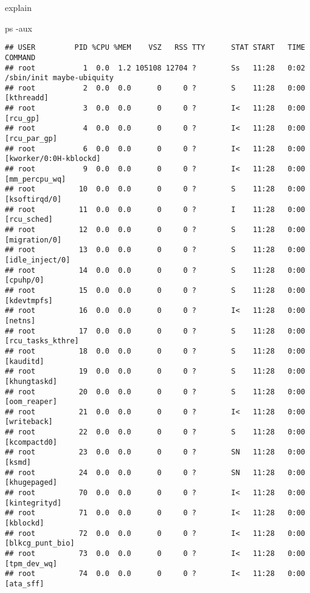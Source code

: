 \documentclass[]{article}
\newenvironment{Shaded}{}{}
\newcommand{\FunctionTok}[1]{\textcolor[rgb]{0.02,0.16,0.49}{#1}}
\newcommand{\NormalTok}[1]{#1}
\begin{document}
explain

\begin{Shaded}
\begin{Highlighting}[]
\FunctionTok{ps}\NormalTok{ -aux}
\end{Highlighting}
\end{Shaded}

\begin{verbatim}
## USER         PID %CPU %MEM    VSZ   RSS TTY      STAT START   TIME COMMAND
## root           1  0.0  1.2 105108 12704 ?        Ss   11:28   0:02 /sbin/init maybe-ubiquity
## root           2  0.0  0.0      0     0 ?        S    11:28   0:00 [kthreadd]
## root           3  0.0  0.0      0     0 ?        I<   11:28   0:00 [rcu_gp]
## root           4  0.0  0.0      0     0 ?        I<   11:28   0:00 [rcu_par_gp]
## root           6  0.0  0.0      0     0 ?        I<   11:28   0:00 [kworker/0:0H-kblockd]
## root           9  0.0  0.0      0     0 ?        I<   11:28   0:00 [mm_percpu_wq]
## root          10  0.0  0.0      0     0 ?        S    11:28   0:00 [ksoftirqd/0]
## root          11  0.0  0.0      0     0 ?        I    11:28   0:00 [rcu_sched]
## root          12  0.0  0.0      0     0 ?        S    11:28   0:00 [migration/0]
## root          13  0.0  0.0      0     0 ?        S    11:28   0:00 [idle_inject/0]
## root          14  0.0  0.0      0     0 ?        S    11:28   0:00 [cpuhp/0]
## root          15  0.0  0.0      0     0 ?        S    11:28   0:00 [kdevtmpfs]
## root          16  0.0  0.0      0     0 ?        I<   11:28   0:00 [netns]
## root          17  0.0  0.0      0     0 ?        S    11:28   0:00 [rcu_tasks_kthre]
## root          18  0.0  0.0      0     0 ?        S    11:28   0:00 [kauditd]
## root          19  0.0  0.0      0     0 ?        S    11:28   0:00 [khungtaskd]
## root          20  0.0  0.0      0     0 ?        S    11:28   0:00 [oom_reaper]
## root          21  0.0  0.0      0     0 ?        I<   11:28   0:00 [writeback]
## root          22  0.0  0.0      0     0 ?        S    11:28   0:00 [kcompactd0]
## root          23  0.0  0.0      0     0 ?        SN   11:28   0:00 [ksmd]
## root          24  0.0  0.0      0     0 ?        SN   11:28   0:00 [khugepaged]
## root          70  0.0  0.0      0     0 ?        I<   11:28   0:00 [kintegrityd]
## root          71  0.0  0.0      0     0 ?        I<   11:28   0:00 [kblockd]
## root          72  0.0  0.0      0     0 ?        I<   11:28   0:00 [blkcg_punt_bio]
## root          73  0.0  0.0      0     0 ?        I<   11:28   0:00 [tpm_dev_wq]
## root          74  0.0  0.0      0     0 ?        I<   11:28   0:00 [ata_sff]

\end{verbatim}
\end{document}
